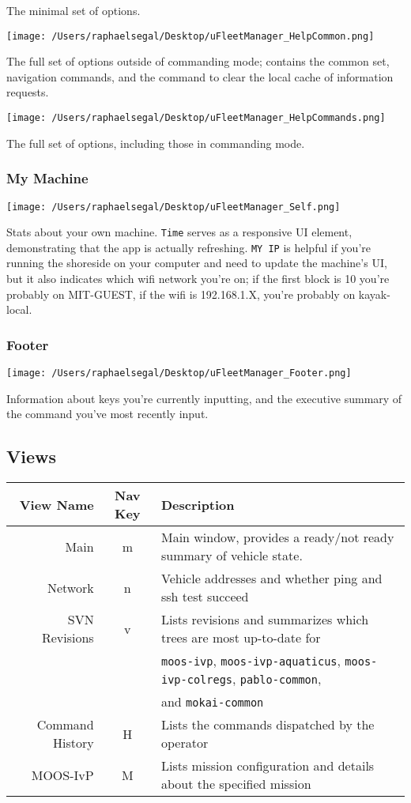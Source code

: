 \documentclass[11pt]{article}
\begin{document}
The minimal set of options.

\texttt{[image: /Users/raphaelsegal/Desktop/uFleetManager\_HelpCommon.png]}

The full set of options outside of commanding mode; contains the common set, navigation commands, and the command to clear the local cache of information requests.

\texttt{[image: /Users/raphaelsegal/Desktop/uFleetManager\_HelpCommands.png]}

The full set of options, including those in commanding mode.

\subsubsection{My Machine}
\texttt{[image: /Users/raphaelsegal/Desktop/uFleetManager\_Self.png]}

Stats about your own machine. \texttt{Time} serves as a responsive UI element, demonstrating that the app is actually refreshing. \texttt{MY IP} is helpful if you're running the shoreside on your computer and need to update the machine's UI, but it also indicates which wifi network you're on; if the first block is 10 you're probably on MIT-GUEST, if the wifi is 192.168.1.X, you're probably on kayak-local.
\subsubsection{Footer}
\texttt{[image: /Users/raphaelsegal/Desktop/uFleetManager\_Footer.png]}

Information about keys you're currently inputting, and the executive summary of the command you've most recently input.
\subsection{Views}
\begin{tabular}{r|cl}
View Name & Nav Key & Description\\
\hline
Main & m & Main window, provides a ready/not ready summary of vehicle state.\\
Network & n & Vehicle addresses and whether ping and ssh test succeed\\
SVN Revisions & v & Lists revisions and summarizes which trees are most up-to-date for\\&& \texttt{moos-ivp}, \texttt{moos-ivp-aquaticus}, \texttt{moos-ivp-colregs}, \texttt{pablo-common},\\
&& and \texttt{mokai-common}\\
Command History & H & Lists the commands dispatched by the operator\\
MOOS-IvP & M & Lists mission configuration and details about the specified mission\\
\end{tabular}
\end{document}
